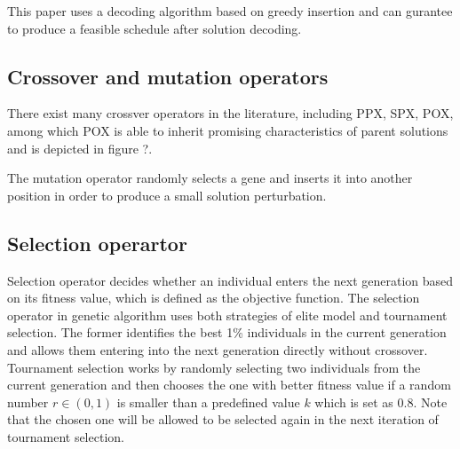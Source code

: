 This paper uses a decoding algorithm based on greedy insertion and can gurantee to produce a feasible schedule after solution decoding.

\subsection{Crossover and mutation operators}
There exist many crossver operators in the literature, including PPX, SPX, POX, among which POX is able to inherit promising characteristics of parent solutions and is depicted in figure ?.

The mutation operator randomly selects a gene and inserts it into another position in order to produce a small solution perturbation.


\subsection{Selection operartor}
Selection operator decides whether an individual enters the next generation based on its fitness value, which is defined as the objective function.
The selection operator in genetic algorithm uses both strategies of elite model and tournament selection.
The former identifies the best 1\% individuals in the current generation and allows them entering into the next generation directly without crossover.
Tournament selection works by randomly selecting two individuals from the current generation and then chooses the one with better fitness value if a random number $r \in (0,1)$ is smaller than a predefined value $k$ which is set as 0.8. 
Note that the chosen one will be allowed to be selected again in the next iteration of tournament selection.



